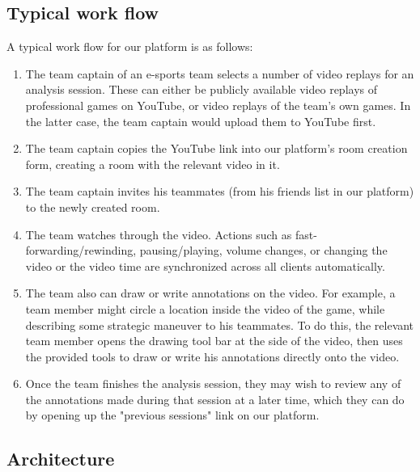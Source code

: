 \documentclass[conference]{IEEEtran}
\begin{document}
\subsection{Typical work flow}

  A typical work flow for our platform is as follows:

  \begin{enumerate}
      \item The team captain of an e-sports team selects a number of video replays for an analysis session. These can either be publicly available video replays of professional games on YouTube, or video replays of the team's own games. In the latter case, the team captain would upload them to YouTube first.

      \item The team captain copies the YouTube link into our platform's room creation form, creating a room with the relevant video in it.

      \item The team captain invites his teammates (from his friends list in our platform) to the newly created room.

      \item The team watches through the video. Actions such as fast-forwarding/rewinding, pausing/playing, volume changes, or changing the video or the video time are synchronized across all clients automatically.

      \item The team also can draw or write annotations on the video. For example, a team member might circle a location inside the video of the game, while describing some strategic maneuver to his teammates. To do this, the relevant team member opens the drawing tool bar at the side of the video, then uses the provided tools to draw or write his annotations directly onto the video.

      \item Once the team finishes the analysis session, they may wish to review any of the annotations made during that session at a later time, which they can do by opening up the "previous sessions" link on our platform.
  \end{enumerate}

\subsection{Architecture}
\end{document}
